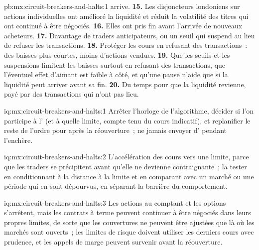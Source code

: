 \begin{solution}{pb:mx:circuit-breakers-and-halts:1}
arrive.
\textbf{15.} Les disjoncteurs londoniens sur actions individuelles ont amélioré la liquidité et réduit la volatilité des titres qui ont continué à être négociés.
\textbf{16.} Elles ont pris fin avant l'arrivée de nouveaux acheteurs.
\textbf{17.} Davantage de traders anticipateurs, ou un seuil qui suspend au lieu de refuser les transactions.
\textbf{18.} Protéger les cours en refusant des transactions~: des baisses plus courtes, moins d'actions vendues.
\textbf{19.} Que les seuils et les suspensions limitent les baisses surtout en refusant des transactions, que l'éventuel effet d'aimant est faible à côté, et qu'une pause n'aide que si
la liquidité peut arriver avant sa fin.
\textbf{20.} Du temps pour que la liquidité revienne, payé par des transactions qui n'ont pas lieu.
\end{solution}

\begin{solution}{iq:mx:circuit-breakers-and-halts:1}
Arrêter l'horloge de l'algorithme, décider si l'on participe à l' (et à quelle limite, compte tenu du cours indicatif), et replanifier le reste
de l'ordre pour après la réouverture~; ne jamais envoyer d' pendant l'enchère.
\end{solution}

\begin{solution}{iq:mx:circuit-breakers-and-halts:2}
L'accélération des cours vers une limite, parce que les traders se précipitent avant qu'elle ne devienne contraignante~; la tester en conditionnant à la distance à la limite et en comparant avec un
marché ou une période qui en sont dépourvus, en séparant la barrière du comportement.
\end{solution}

\begin{solution}{iq:mx:circuit-breakers-and-halts:3}
Les actions au comptant et les options s'arrêtent, mais les contrats à terme peuvent continuer à être négociés dans leurs propres limites, de sorte que les couvertures ne peuvent être ajustées que là où les marchés sont ouverts~; les limites de
risque doivent utiliser les derniers cours avec prudence, et les appels de marge peuvent survenir avant la réouverture.
\end{solution}

